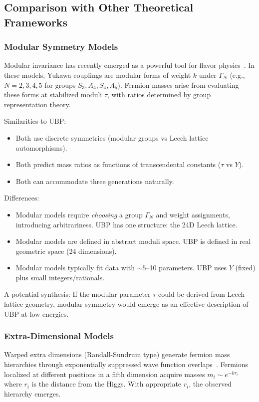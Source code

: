 \documentclass[11pt,a4paper]{article}
\begin{document}
\subsection{Comparison with Other Theoretical Frameworks}

\subsubsection{Modular Symmetry Models}

Modular invariance has recently emerged as a powerful tool for flavor physics~\cite{ref001,ref006}. In these models, Yukawa couplings are modular forms of weight $k$ under $\Gamma_N$ (e.g., $N=2,3,4,5$ for groups $S_3, A_4, S_4, A_5$). Fermion masses arise from evaluating these forms at stabilized moduli $\tau$, with ratios determined by group representation theory.

Similarities to UBP:
\begin{itemize}
\item Both use discrete symmetries (modular groups vs Leech lattice automorphisms).
\item Both predict mass ratios as functions of transcendental constants ($\tau$ vs $Y$).
\item Both can accommodate three generations naturally.
\end{itemize}

Differences:
\begin{itemize}
\item Modular models require \emph{choosing} a group $\Gamma_N$ and weight assignments, introducing arbitrariness. UBP has one structure: the 24D Leech lattice.
\item Modular models are defined in abstract moduli space. UBP is defined in real geometric space (24 dimensions).
\item Modular models typically fit data with $\sim 5$--10 parameters. UBP uses $Y$ (fixed) plus small integers/rationals.
\end{itemize}

A potential synthesis: If the modular parameter $\tau$ could be derived from Leech lattice geometry, modular symmetry would emerge as an effective description of UBP at low energies.

\subsubsection{Extra-Dimensional Models}

Warped extra dimensions (Randall-Sundrum type) generate fermion mass hierarchies through exponentially suppressed wave function overlaps~\cite{ref002}. Fermions localized at different positions in a fifth dimension acquire masses $m_i \sim e^{-k r_i}$ where $r_i$ is the distance from the Higgs. With appropriate $r_i$, the observed hierarchy emerges.
\end{document}
